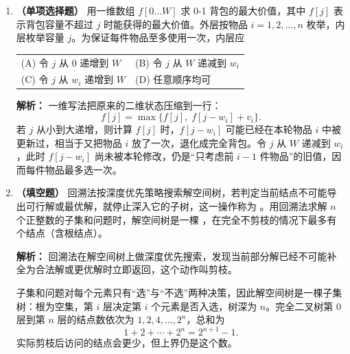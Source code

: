\begin{enumerate}
(A) 错在把“局部最优”直接当成“全局最优”。(B) 的反例：背包容量 $W=10$，三件物品 $(w,v)$ 分别为 $(6,30)$、$(5,24)$、$(5,24)$，单位重量价值分别为 $5,4.8,4.8$。按单位价值贪心先取第一件，剩余容量 $4$ 放不下任何一件，总价值 $30$；而取后两件可得 $24+24=48$，所以该贪心策略不是最优。(D) 也不对，例如 0-1 背包的动态规划为 $O(nW)$，而按单位价值排序只需 $O(n\log n)$，贪心不一定更慢，只是可能得不到正确答案。\else \answerarea \fi

\item \textbf{（单项选择题）} 用一维数组 $f[0\ldots W]$ 求 0-1 背包的最大价值，其中 $f[j]$ 表示背包容量不超过 $j$ 时能获得的最大价值。外层按物品 $i=1,2,\ldots,n$ 枚举，内层枚举容量 $j$。为保证每件物品至多使用一次，内层应
\begin{center}
\begin{tabular}{ll}
(A) 令 $j$ 从 $0$ 递增到 $W$ & (B) 令 $j$ 从 $W$ 递减到 $w_i$ \\[4pt]
(C) 令 $j$ 从 $w_i$ 递增到 $W$ & (D) 任意顺序均可
\end{tabular}
\end{center}

\ifshowsolutions\par\noindent\textbf{解析：} 一维写法把原来的二维状态压缩到一行：
\[
f[j]=\max\{f[j],\;f[j-w_i]+v_i\}.
\]
若 $j$ 从小到大递增，则计算 $f[j]$ 时，$f[j-w_i]$ 可能已经在本轮物品 $i$ 中被更新过，相当于又把物品 $i$ 放了一次，退化成完全背包。令 $j$ 从 $W$ 递减到 $w_i$，此时 $f[j-w_i]$ 尚未被本轮修改，仍是“只考虑前 $i-1$ 件物品”的旧值，因而每件物品最多选一次。\else \answerarea \fi

\item \textbf{（填空题）} 回溯法按深度优先策略搜索解空间树，若判定当前结点不可能导出可行解或最优解，就停止深入它的子树，这一操作称为 \underline{\qquad\qquad}。用回溯法求解 $n$ 个正整数的子集和问题时，解空间树是一棵 \underline{\qquad\qquad}，在完全不剪枝的情况下最多有 \underline{\qquad\qquad} 个结点（含根结点）。

\ifshowsolutions\par\noindent\textbf{解析：} 回溯法在解空间树上做深度优先搜索，发现当前部分解已经不可能补全为合法解或更优解时立即返回，这个动作叫剪枝。

子集和问题对每个元素只有“选”与“不选”两种决策，因此解空间树是一棵子集树：根为空集，第 $i$ 层决定第 $i$ 个元素是否入选，树深为 $n$。完全二叉树第 $0$ 层到第 $n$ 层的结点数依次为 $1,2,4,\ldots,2^n$，总和为
\[
1+2+\cdots+2^n=2^{n+1}-1.
\]
实际剪枝后访问的结点会更少，但上界仍是这个数。\else \answerarea \fi


\end{enumerate}
